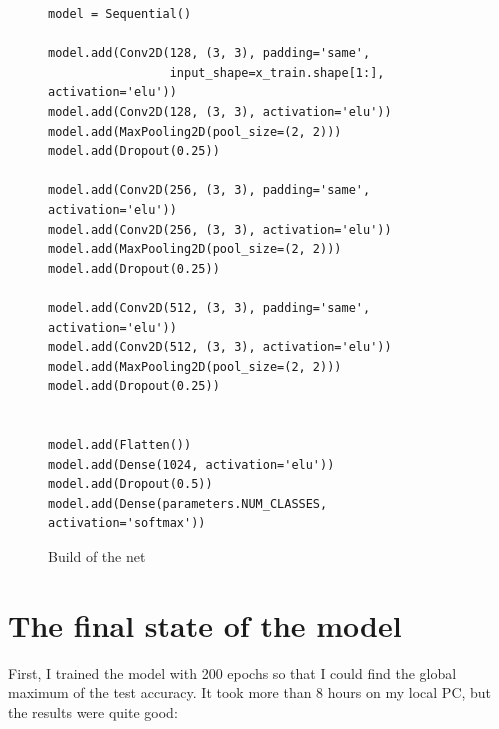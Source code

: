 \documentclass[12pt,english]{article}
\begin{document}
\begin{figure}[H]
\centering
\begin{verbatim}
model = Sequential()

model.add(Conv2D(128, (3, 3), padding='same',
                 input_shape=x_train.shape[1:], activation='elu'))
model.add(Conv2D(128, (3, 3), activation='elu'))
model.add(MaxPooling2D(pool_size=(2, 2)))
model.add(Dropout(0.25))

model.add(Conv2D(256, (3, 3), padding='same', activation='elu'))
model.add(Conv2D(256, (3, 3), activation='elu'))
model.add(MaxPooling2D(pool_size=(2, 2)))
model.add(Dropout(0.25))

model.add(Conv2D(512, (3, 3), padding='same', activation='elu'))
model.add(Conv2D(512, (3, 3), activation='elu'))
model.add(MaxPooling2D(pool_size=(2, 2)))
model.add(Dropout(0.25))


model.add(Flatten())
model.add(Dense(1024, activation='elu'))
model.add(Dropout(0.5))
model.add(Dense(parameters.NUM_CLASSES, activation='softmax'))

\end{verbatim}
\caption{Build of the net}
\end{figure}

\newpage

\section{The final state of the model}

First, I trained the model with 200 epochs so that I could find the global maximum of the test accuracy. It took more than 8 hours on my local PC, but the results were quite good:
\end{document}
